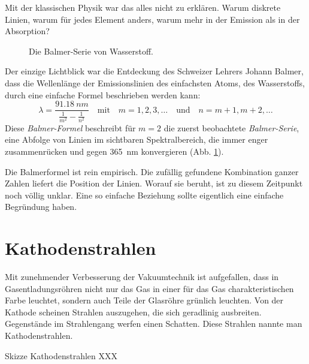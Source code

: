 Mit der klassischen Physik war das alles nicht zu erklären. Warum diskrete Linien, warum für jedes Element anders, warum mehr in der Emission als in der Absorption?


\begin{figure}
    \pgfspectra[width=\textwidth, element=H,back=visible40, gamma=.6,axis, axis step=50,axis ticks=4,begin=300,end=750,
    axis label text={Wellenlänge $\lambda$ (nm)},axis label position=right, UVcolor=white, IRcolor=white]
    
    \caption{Die Balmer-Serie von Wasserstoff.}
    \label{fig:1_balmer}
    \end{figure}

Der einzige Lichtblick war die Entdeckung des Schweizer Lehrers Johann Balmer, dass die Wellenlänge der Emissionslinien des einfachsten Atoms, des Wasserstoffs, durch eine einfache Formel beschrieben werden kann:
\begin{equation}
    \lambda = \frac{\SI{91.18}{nm}}{ 
       \frac{1}{m^2} - \frac{1}{n^2} 
    }
    \quad \text{mit} \quad m = 1,2, 3, \dots \quad \text{und} \quad n = m+1, m+2, \dots
\end{equation}
Diese \emph{Balmer-Formel} beschreibt für $m=2$ die zuerst beobachtete \emph{Balmer-Serie}, eine Abfolge von Linien im sichtbaren Spektralbereich, die immer enger zusammenrücken und gegen 365~nm konvergieren (Abb. \ref{fig:1_balmer}).

Die Balmerformel ist rein empirisch. Die zufällig gefundene Kombination ganzer Zahlen liefert die Position der Linien. Worauf sie beruht, ist zu diesem Zeitpunkt noch völlig unklar. Eine so einfache Beziehung sollte eigentlich eine einfache Begründung haben.


\section{Kathodenstrahlen}

Mit zunehmender Verbesserung der Vakuumtechnik ist aufgefallen, dass in Gasentladungsröhren nicht nur das Gas in einer für das Gas charakteristischen Farbe leuchtet, sondern auch Teile der Glasröhre grünlich leuchten.  Von der Kathode scheinen Strahlen auszugehen, die sich geradlinig ausbreiten. Gegenstände im Strahlengang werfen einen Schatten. Diese Strahlen nannte man Kathodenstrahlen.

\begin{marginfigure}
    \caption{Skizze Kathodenstrahlen XXX}
\end{marginfigure}

